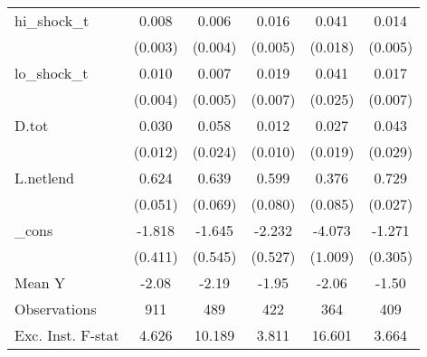 {\begin{tabular}{l*{5}{c}}
\addlinespace
hi\_shock\_t  &       0.008\sym{**} &       0.006         &       0.016\sym{***}&       0.041\sym{**} &       0.014\sym{**} \\
            &     (0.003)         &     (0.004)         &     (0.005)         &     (0.018)         &     (0.005)         \\
\addlinespace
lo\_shock\_t  &       0.010\sym{**} &       0.007         &       0.019\sym{**} &       0.041         &       0.017\sym{**} \\
            &     (0.004)         &     (0.005)         &     (0.007)         &     (0.025)         &     (0.007)         \\
\addlinespace
D.tot       &       0.030\sym{**} &       0.058\sym{**} &       0.012         &       0.027         &       0.043         \\
            &     (0.012)         &     (0.024)         &     (0.010)         &     (0.019)         &     (0.029)         \\
\addlinespace
L.netlend   &       0.624\sym{***}&       0.639\sym{***}&       0.599\sym{***}&       0.376\sym{***}&       0.729\sym{***}\\
            &     (0.051)         &     (0.069)         &     (0.080)         &     (0.085)         &     (0.027)         \\
\addlinespace
\_cons      &      -1.818\sym{***}&      -1.645\sym{***}&      -2.232\sym{***}&      -4.073\sym{***}&      -1.271\sym{***}\\
            &     (0.411)         &     (0.545)         &     (0.527)         &     (1.009)         &     (0.305)         \\
\midrule
Mean Y      &       -2.08         &       -2.19         &       -1.95         &       -2.06         &       -1.50         \\
Observations&         911         &         489         &         422         &         364         &         409         \\
Exc. Inst. F-stat&       4.626         &      10.189         &       3.811         &      16.601         &       3.664         \\
\bottomrule
\end{tabular}
}
